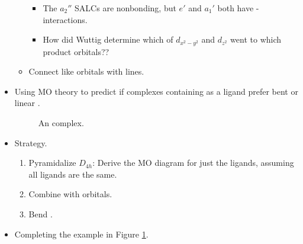 \documentclass[../notes.tex]{subfiles}
\begin{document}
\begin{itemize}
\begin{itemize}
\begin{itemize}
            \item The $a_2''$ SALCs are nonbonding, but $e'$ and $a_1'$ both have - interactions.
            \item How did Wuttig determine which of $d_{x^2-y^2}$ and $d_{z^2}$ went to which product orbitals??
        \end{itemize}
        \item Connect like orbitals with lines.
    \end{itemize}
    \item Using MO theory to predict if complexes containing  as a ligand prefer bent or linear .
    \begin{figure}[H]
        \centering
        \footnotesize
        \caption{An  complex.}
        \label{fig:NOcomplex}
    \end{figure}
    \item Strategy.
    \begin{enumerate}
        \item Pyramidalize $D_{4h}$: Derive the MO diagram for just the  ligands, assuming all ligands are the same.
        \item Combine with  orbitals.
        \item Bend .
    \end{enumerate}
    \item Completing the example in Figure \ref{fig:NOcomplex}.
    \begin{figure}[h!]
        \centering
\end{figure}
\end{itemize}
\end{document}
